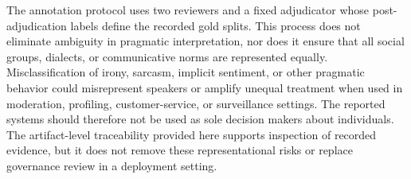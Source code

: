 The annotation protocol uses two reviewers and a fixed adjudicator whose post-adjudication labels define the recorded gold splits.  This process does not eliminate ambiguity in pragmatic interpretation, nor does it ensure that all social groups, dialects, or communicative norms are represented equally.  Misclassification of irony, sarcasm, implicit sentiment, or other pragmatic behavior could misrepresent speakers or amplify unequal treatment when used in moderation, profiling, customer-service, or surveillance settings.  The reported systems should therefore not be used as sole decision makers about individuals.  The artifact-level traceability provided here supports inspection of recorded evidence, but it does not remove these representational risks or replace governance review in a deployment setting.
